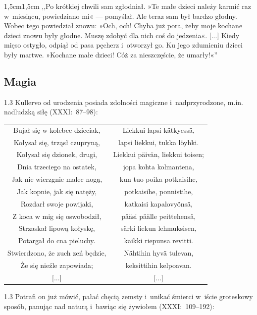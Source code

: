 \documentclass[11pt,a4paper,twoside]{report}
\begin{document}
\begin{adjustwidth}{1,5cm}{1,5cm}
\small{
,,Po krótkiej chwili sam zgłodniał. »Te małe dzieci należy karmić raz w~miesiącu, powiedziano mi« --- pomyślał. Ale teraz sam był bardzo głodny. Wobec tego powiedział znowu: »Och, och! Chyba już pora, żeby moje kochane dzieci znowu były głodne. Muszę zdobyć dla nich coś do jedzenia«. [...] Kiedy mięso ostygło, odpiął od pasa pęcherz i~otworzył go. Ku jego zdumieniu dzieci były martwe. »Kochane małe dzieci! Cóż za nieszczęście, że umarły!«''}\\
\end{adjustwidth}
\vspace*{0.5\baselineskip}
\subsection*{Magia}
\begin{spacing}{1.3}
Kullervo od urodzenia posiada zdolności magiczne i~nadprzyrodzone, m.in. nadludzką siłę (XXXI:~87--98):
\end{spacing}
{\centering
\small
\begin{longtable}{c c}
Bujał się w kolebce dzieciak, & Liekkui lapsi kätkyessä, \\
Kołysał się, trząsł czupryną, & lapsi liekkui, tukka löyhki. \\
Kołysał się dzionek, drugi, & Liekkui päivän, liekkui toisen; \\
Dnia trzeciego na ostatek, & jopa kohta kolmantena, \\
Jak nie wierzgnie malec nogą, & kun tuo poika potkaisihe, \\
Jak kopnie, jak się natęży, & potkaisihe, ponnistihe, \\
Rozdarł swoje powijaki, & katkaisi kapalovyönsä, \\
Z koca w mig się oswobodził, & pääsi päälle peittehensä, \\
Strzaskał lipową kołyskę, & särki liekun lehmuksisen, \\
Potargał do cna pieluchy. & kaikki riepunsa revitti. \\
Stwierdzono, że zuch zeń będzie, & Nähtihin hyvä tulevan, \\
Że się nieźle zapowiada; & keksittihin kelpoavan. \\
{[...]} & {[...]} \\
\end{longtable}
}
\begin{spacing}{1.3}
Potrafi on już mówić, pałać chęcią zemsty i~unikać śmierci w~iście groteskowy sposób, panując nad naturą i~bawiąc się żywiołem (XXXI:~109--192):
\end{spacing}
\end{document}
